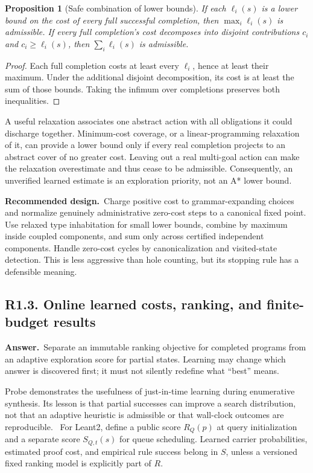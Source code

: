\documentclass[11pt,a4paper]{article}
\newcommand{\qid}[3]{\subsection{#2. #3}\label{#1}}
\newcommand{\answer}{\noindent\textbf{Answer.}\ }
\newcommand{\proposal}{\noindent\textbf{Recommended design.}\ }
\newtheorem{proposition}{Proposition}[section]
\theoremstyle{remark}
\begin{document}
\begin{proposition}[Safe combination of lower bounds]
If each $\ell_i(s)$ is a lower bound on the cost of every full successful completion, then $\max_i\ell_i(s)$ is admissible. If every full completion's cost decomposes into disjoint contributions $c_i$ and $c_i\geq\ell_i(s)$, then $\sum_i\ell_i(s)$ is admissible.
\end{proposition}
\begin{proof}
Each full completion costs at least every $\ell_i$, hence at least their maximum. Under the additional disjoint decomposition, its cost is at least the sum of those bounds. Taking the infimum over completions preserves both inequalities.
\end{proof}

A useful relaxation associates one abstract action with all obligations it could discharge together. Minimum-cost coverage, or a linear-programming relaxation of it, can provide a lower bound only if every real completion projects to an abstract cover of no greater cost. Leaving out a real multi-goal action can make the relaxation overestimate and thus cease to be admissible. Consequently, an unverified learned estimate is an exploration priority, not an A* lower bound.

\proposal Charge positive cost to grammar-expanding choices and normalize genuinely administrative zero-cost steps to a canonical fixed point. Use relaxed type inhabitation for small lower bounds, combine by maximum inside coupled components, and sum only across certified independent components. Handle zero-cost cycles by canonicalization and visited-state detection. This is less aggressive than hole counting, but its stopping rule has a defensible meaning.

\qid{q13}{R1.3}{Online learned costs, ranking, and finite-budget results}
\answer Separate an immutable ranking objective for completed programs from an adaptive exploration score for partial states. Learning may change which answer is discovered first; it must not silently redefine what ``best'' means.

Probe demonstrates the usefulness of just-in-time learning during enumerative synthesis. Its lesson is that partial successes can improve a search distribution, not that an adaptive heuristic is admissible or that wall-clock outcomes are reproducible.~\cite{probe} For Leant2, define a public score $R_Q(p)$ at query initialization and a separate score $S_{Q,t}(s)$ for queue scheduling. Learned carrier probabilities, estimated proof cost, and empirical rule success belong in $S$, unless a versioned fixed ranking model is explicitly part of $R$.
\end{document}

